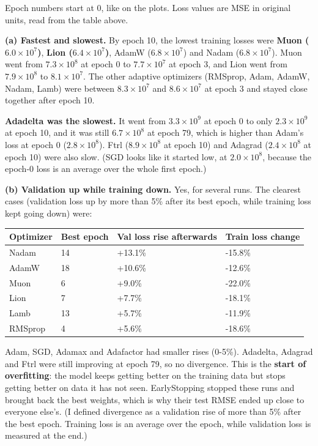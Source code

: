 \documentclass[12pt,a4paper]{article}
\begin{document}
\begin{answerbox}
Epoch numbers start at 0, like on the plots. Loss values are MSE in original units, read from the table above.

\textbf{(a) Fastest and slowest.} By epoch 10, the lowest training losses were \textbf{Muon (\(6.0\times10^7\))}, \textbf{Lion (\(6.4\times10^7\))}, AdamW (\(6.8\times10^7\)) and Nadam (\(6.8\times10^7\)). Muon went from \(7.3\times10^8\) at epoch 0 to \(7.7\times10^7\) at epoch 3, and Lion went from \(7.9\times10^8\) to \(8.1\times10^7\). The other adaptive optimizers (RMSprop, Adam, AdamW, Nadam, Lamb) were between \(8.3\times10^7\) and \(8.6\times10^7\) at epoch 3 and stayed close together after epoch 10.

\textbf{Adadelta was the slowest.} It went from \(3.3\times10^9\) at epoch 0 to only \(2.3\times10^9\) at epoch 10, and it was still \(6.7\times10^8\) at epoch 79, which is higher than Adam's loss at epoch 0 (\(2.8\times10^8\)). Ftrl (\(8.9\times10^8\) at epoch 10) and Adagrad (\(2.4\times10^8\) at epoch 10) were also slow. (SGD looks like it started low, at \(2.0\times10^8\), because the epoch-0 loss is an average over the whole first epoch.)

\textbf{(b) Validation up while training down.} Yes, for several runs. The clearest cases (validation loss up by more than 5\% after its best epoch, while training loss kept going down) were:

\begin{center}\small
\begin{tabular}{@{}llll@{}}
\toprule
Optimizer & Best epoch & Val loss rise afterwards & Train loss change \\
\midrule
Nadam & 14 & +13.1\% & -15.8\% \\
AdamW & 18 & +10.6\% & -12.6\% \\
Muon & 6 & +9.0\% & -22.0\% \\
Lion & 7 & +7.7\% & -18.1\% \\
Lamb & 13 & +5.7\% & -11.9\% \\
RMSprop & 4 & +5.6\% & -18.6\% \\
\bottomrule
\end{tabular}
\end{center}

Adam, SGD, Adamax and Adafactor had smaller rises (0-5\%). Adadelta, Adagrad and Ftrl were still improving at epoch 79, so no divergence. This is the \textbf{start of overfitting}: the model keeps getting better on the training data but stops getting better on data it has not seen. EarlyStopping stopped these runs and brought back the best weights, which is why their test RMSE ended up close to everyone else's. (I defined divergence as a validation rise of more than 5\% after the best epoch. Training loss is an average over the epoch, while validation loss is measured at the end.)


\end{answerbox}
\end{document}
